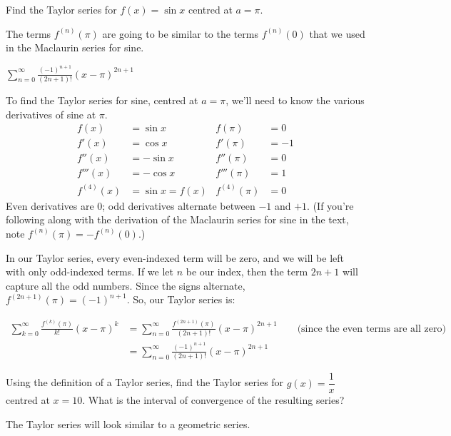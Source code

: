 \begin{question}
	Find the Taylor series for $f(x)=\sin x$ centred at $a=\pi$.
\end{question}
\begin{hint}
The terms $f^{(n)}(\pi)$ are going to be similar to the terms $f^{(n)}(0)$ that we used in the Maclaurin series for sine.
\end{hint}
\begin{answer}
	$\displaystyle \sum_{n=0}^\infty \frac{(-1)^{n+1}}{(2n+1)!}(x-\pi)^{2n+1}$
\end{answer}
\begin{solution}
	To find the Taylor series for sine, centred at $a=\pi$, we'll need to know the various derivatives of sine at $\pi$.
	\begin{align*}
	f(x)&=\sin x & f(\pi)&=0\\
	f'(x)&=\cos x & f'(\pi)&=-1\\
	f''(x)&=-\sin x & f''(\pi)&=0\\
	f'''(x)&=-\cos x & f'''(\pi)&=1\\
	f^{(4)}(x)&=\sin x = f(x) & f^{(4)}(\pi)&=0
	\end{align*}
	Even derivatives are 0; odd derivatives alternate between $-1$ and $+1$. (If you're following along with the derivation of the Maclaurin series for sine in the text, note $f^{(n)}(\pi)=-f^{(n)}(0)$.)

	In our Taylor series, every even-indexed term will be zero, and we will be left with only odd-indexed terms. If we let $n$ be our index, then the term $2n+1$ will capture all the odd numbers. Since the signs alternate, $f^{(2n+1)}(\pi)=(-1)^{n+1}$. So, our Taylor series is:

	\begin{align*}
	\sum_{k=0}^\infty \frac{f^{(k)}(\pi)}{k!}(x-\pi)^k &= \sum_{n=0}^\infty \frac{f^{(2n+1)}(\pi)}{(2n+1)!}(x-\pi)^{2n+1} \qquad\text{(since the even terms are all zero)} \\
	&=\sum_{n=0}^\infty \frac{(-1)^{n+1}}{(2n+1)!}(x-\pi)^{2n+1}
	\end{align*}

\end{solution}
\begin{Mquestion}
Using the definition of a Taylor series, find the Taylor series for $g(x)=\dfrac{1}{x}$ centred at $x=10$. What is the interval of convergence of the resulting series?
\end{Mquestion}
\begin{hint}
	The Taylor series will look similar to a geometric series.
\end{hint}
